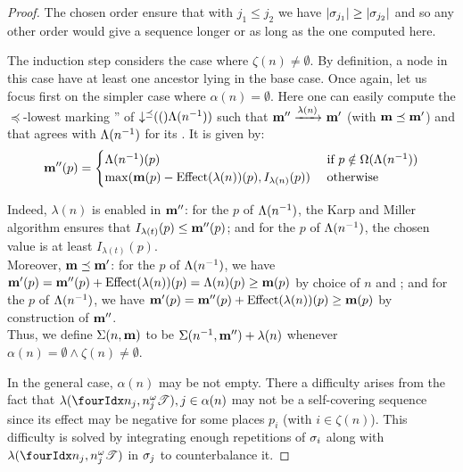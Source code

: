 \begin{proof}
  The chosen order ensure that with $j_1 \leq j_2$ we have $\card{\seqt_{j_1}} \geq \card{\seqt_{j_2}}$ and so any other order would give a sequence longer or as long as the one computed here.


  The induction step considers the case where $\zeta(n) \neq \emptyset$.
  By definition, a node in this case have at least one ancestor lying in the base case.
  Once again, let us focus first on the simpler case where $\alpha(n) = \emptyset$.
  Here one can easily compute the $\preceq$-lowest marking \mar'' of $\operatorname{\downarrow^\preceq}(()\Lambda(n^{-1}))$ such that $\mathbf{m}'' \xrightarrow{\lambda(n)}_{} \mathbf{m}'$ (with $\mathbf{m} \preceq \mathbf{m}'$) and that agrees with $\Lambda(n^{-1})$ for its \noplaces. It is given by:
  \[
    \mathbf{m}''(p) = \begin{cases}
      \Lambda(n^{-1})(p)
        &\text{ if } p \notin \Omega(\Lambda(n^{-1})) \\
      \max(\mathbf{m}(p) - \operatorname{Effect}(\lambda(n))(p), I_{\lambda(n)}(p))
        &\text{ otherwise}
    \end{cases}
  \]

  Indeed, %
  $\lambda(n)$ is enabled in $\mathbf{m}''$:
  for the \noplaces $p$ of $\Lambda(n^{-1})$, the Karp and Miller algorithm ensures that $I_{\lambda(t)}(p) \leq \mathbf{m}''(p)$;
  and for the \oplaces $p$ of $\Lambda(n^{-1})$, the chosen value is at least $I_{\lambda(t)}(p)$.\\
  Moreover, %
  $\mathbf{m} \preceq \mathbf{m}'$:
  for the \noplaces $p$ of $\Lambda(n^{-1})$, we have $\mathbf{m}'(p) = \mathbf{m}''(p) + \operatorname{Effect}(\lambda(n))(p) = \Lambda(n)(p) \geq \mathbf{m}(p)$ by choice of $n$ and \mar;
  and for the \oplaces $p$ of $\Lambda(n^{-1})$, we have $\mathbf{m}'(p) = \mathbf{m}''(p) + \operatorname{Effect}(\lambda(n))(p) \geq \mathbf{m}(p)$ by construction of $\mathbf{m}''$.\\
  Thus, we define
  $\Sigma(n, \mathbf{m})$ to be $\Sigma(n^{-1}, \mathbf{m}'') + \lambda(n)$
  whenever
  $\alpha(n) = \emptyset \wedge \zeta(n) \neq \emptyset$.

  In the general case, $\alpha(n)$ may be not empty.
  There a difficulty arises from the fact that $\lambda(\treepath{n_j,n^\omega_j}), j \in \alpha(n)$ may not be a self-covering sequence since its effect may be negative for some places $p_i$ (with $i \in \zeta(n)$).
  This difficulty is solved by integrating enough repetitions of $\seqt_i$ along with $\lambda(\treepath{n_j,n^\omega_j})$ in $\seqt_j$ to counterbalance it.


\end{proof}
